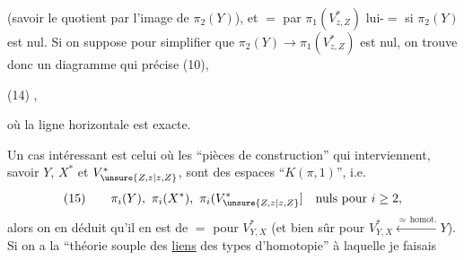 (savoir le quotient par l'image de $\pi_2(Y)$),
et $=$ par $\pi_1(V^*_{z,Z})$ lui-$=$ si $\pi_2(Y)$ est
nul. Si on suppose pour simplifier
que $\pi_2(Y)\longrightarrow\pi_1(V^*_{z,Z})$ est nul, on trouve
donc un diagramme qui précise (10),

\noindent (14)
,

où la ligne horizontale est exacte.

Un cas intéressant est celui où les
``pièces de construction'' qui  interviennent,
savoir $Y$, $X^*$ et $V^*_{\unsure{Z,z|z,Z}}$, sont des espaces
``$K(\pi,1)$'', i.e.
\[
(15)\qquad \pi_i(Y),\ \pi_i(X^*),\ \pi_i(V^*_{\unsure{Z,z|z,Z}}]\quad\text{nuls pour }i\geq 2,
\]
alors on en déduit qu'il en est de $=$
pour $V^*_{Y,X}$ (et bien sûr pour $V^*_{Y,X}\xleftarrow{\approx\,\mathrm{homot.}}Y$).
Si on a la ``théorie souple des \uline{liens} des
types d'homotopie'' à laquelle je faisais
